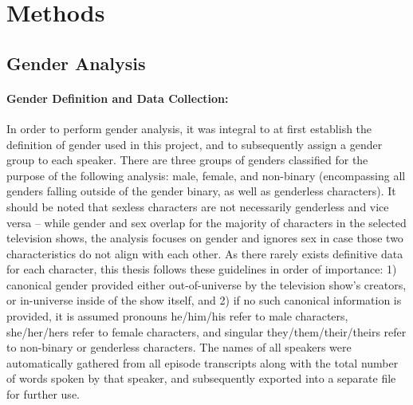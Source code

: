 \documentclass[a4paper, 11pt]{article}
\begin{document}
\section{Methods}

\subsection{Gender Analysis} \label{met:genan}

\paragraph{Gender Definition and Data Collection:}
In order to perform gender analysis, it was integral to at first establish the definition of gender used in this project, and to subsequently assign a gender group to each speaker. There are three groups of genders classified for the purpose of the following analysis: male, female, and non-binary (encompassing all genders falling outside of the gender binary, as well as genderless characters). It should be noted that sexless characters are not necessarily genderless and vice versa -- while gender and sex overlap for the majority of characters in the selected television shows, the analysis focuses on gender and ignores sex in case those two characteristics do not align with each other. As there rarely exists definitive data for each character, this thesis follows these guidelines in order of importance: 1) canonical gender provided either out-of-universe by the television show's creators, or in-universe inside of the show itself, and 2) if no such canonical information is provided, it is assumed pronouns he/him/his refer to male characters, she/her/hers refer to female characters, and singular they/them/their/theirs refer to non-binary or genderless characters. The names of all speakers were automatically gathered from all episode transcripts along with the total number of words spoken by that speaker, and subsequently exported into a separate file for further use.
\end{document}
